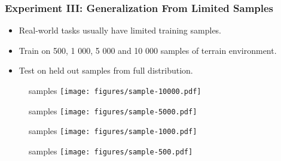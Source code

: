 \begin{frame}
    \frametitle{Experiment III: Generalization From Limited Samples}

    \begin{itemize}
        \item Real-world tasks usually have limited training samples.
        \item Train on 500, 1 000, 5 000 and 10 000 samples of terrain environment.
        \item Test on held out samples from full distribution.
    \end{itemize}
\end{frame}

\begin{frame}
    \begin{figure}
         samples
        \texttt{[image: figures/sample-10000.pdf]}
    \end{figure}
\end{frame}

\begin{frame}
    \begin{figure}
         samples
        \texttt{[image: figures/sample-5000.pdf]}
    \end{figure}
\end{frame}

\begin{frame}
    \begin{figure}
         samples
        \texttt{[image: figures/sample-1000.pdf]}
    \end{figure}
\end{frame}

\begin{frame}
    \begin{figure}
         samples
        \texttt{[image: figures/sample-500.pdf]}
    \end{figure}
\end{frame}